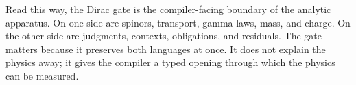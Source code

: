 Read this way, the Dirac gate is the compiler-facing boundary of the analytic apparatus. On one side are
spinors, transport, gamma laws, mass, and charge. On the other side are judgments, contexts, obligations,
and residuals. The gate matters because it preserves both languages at once. It does not explain the
physics away; it gives the compiler a typed opening through which the physics can be measured.
